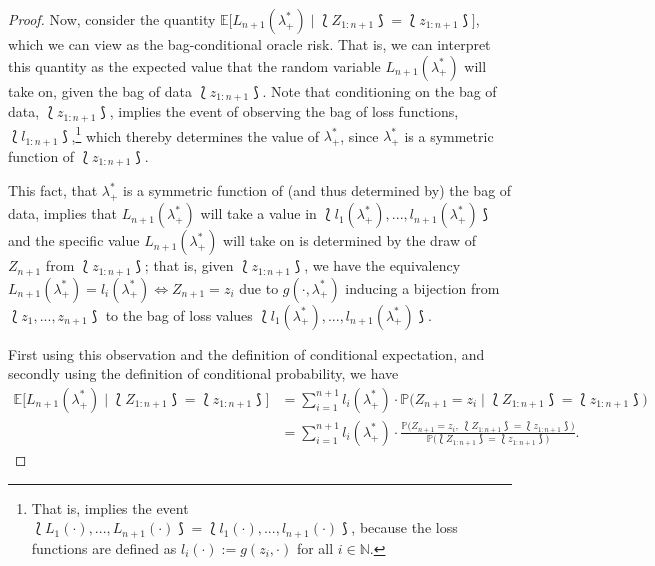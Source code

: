 \begin{proof}
Now, consider the quantity $\mathbb{E}\big[L_{n+1}(\lambda_{+}^*) \mid \lbag Z_{1:n+1} \rbag = \lbag z_{1:n+1} \rbag\big]$, which we can view as the bag-conditional oracle risk. That is, we can interpret this quantity as the expected value that the random variable $L_{n+1}(\lambda_{+}^*)$ will take on, given the bag of data $\lbag z_{1:n+1} \rbag$. Note that conditioning on the bag of data, $\lbag z_{1:n+1} \rbag$, implies the event of observing the bag of loss functions, $\lbag l_{1:n+1} \rbag$,\footnote{That is, implies the event $\lbag L_{1}(\cdot), ..., L_{n+1}(\cdot)\rbag = \lbag l_1(\cdot), ..., l_{n+1}(\cdot) \rbag$, because the loss functions are defined as $l_i(\cdot):=g(z_i, \cdot)$ for all $i\in \mathbb{N}$.} which thereby determines the value of $\lambda_{+}^*$, since $\lambda_{+}^*$ is a symmetric function of $\lbag z_{1:n+1}\rbag$. 

This fact, that $\lambda_{+}^*$ is a symmetric function of (and thus determined by) the bag of data, implies that $L_{n+1}(\lambda_{+}^*)$ will take a value in $\lbag l_1(\lambda_{+}^*), ..., l_{n+1}(\lambda_{+}^*) \rbag$ and the specific value $L_{n+1}(\lambda_{+}^*)$ will take on is determined by the draw of $Z_{n+1}$ from $\lbag z_{1:n+1} \rbag$; that is, given $\lbag z_{1:n+1} \rbag$, we have the equivalency $L_{n+1}(\lambda_{+}^*) = l_i(\lambda_{+}^*)  \iff Z_{n+1} = z_i$ due to $g(\cdot,\lambda_{+}^*)$ inducing a bijection from $\lbag z_1, ..., z_{n+1} \rbag$ to the bag of loss values $\lbag l_{1}(\lambda_{+}^*), ..., l_{n+1}(\lambda_{+}^*) \rbag$.

First using this observation and the definition of conditional expectation, and secondly using the definition of conditional probability, we have
\begin{align*}
    \mathbb{E}\big[L_{n+1}(\lambda_{+}^*) \mid \lbag Z_{1:n+1} \rbag = \lbag z_{1:n+1} \rbag\big] & = \sum_{i=1}^{n+1}l_i(\lambda_{+}^*)\cdot \mathbb{P}\big(Z_{n+1} = z_{i} \mid \lbag Z_{1:n+1} \rbag = \lbag z_{1:n+1} \rbag \big) \\
    & = \sum_{i=1}^{n+1}l_i(\lambda_{+}^*)\cdot \frac{\mathbb{P}\big(Z_{n+1}=z_{i}, \ \lbag Z_{1:n+1} \rbag = \lbag z_{1:n+1} \rbag \big)}{\mathbb{P}\big(\lbag Z_{1:n+1} \rbag = \lbag z_{1:n+1} \rbag\big)}.
\end{align*}


\end{proof}
